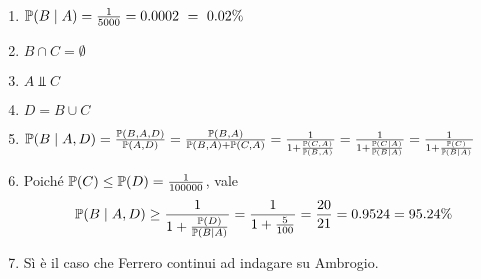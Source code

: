 \begin{enumerate}
\item $\mathbb{P}( B\mid A) =\frac{1}{5000} =0.0002\ =\ 0.02\%$
\item $B\cap C=\emptyset $
\item $A\Bot C$
\item $D=B\cup C$
\item $\mathbb{P}( B\mid A,D) =\frac{\mathbb{P}( B,A,D)}{\mathbb{P}( A,D)} =\frac{\mathbb{P}( B,A)}{\mathbb{P}( B,A) +\mathbb{P}( C,A)} =\frac{1}{1+\frac{\mathbb{P}( C,A)}{\mathbb{P}( B,A)}} =\frac{1}{1+\frac{\mathbb{P}( C\mid A)}{\mathbb{P}( B\mid A)}} =\frac{1}{1+\frac{\mathbb{P}( C)}{\mathbb{P}( B\mid A)}}$
\item Poiché $\mathbb{P}( C) \leq \mathbb{P}( D) =\frac{1}{100000}$, vale
\begin{equation*}
\mathbb{P}( B\mid A,D) \geq \frac{1}{1+\frac{\mathbb{P}( D)}{\mathbb{P}( B\mid A)}} =\frac{1}{1+\frac{5}{100}} =\frac{20}{21} =0.9524=95.24\%
\end{equation*}
\item Sì è il caso che Ferrero continui ad indagare su Ambrogio.
\end{enumerate}
\Soluzione


